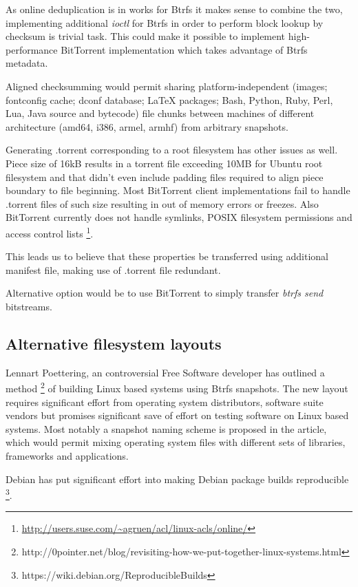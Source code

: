 \documentclass{article}
\begin{document}
As online deduplication is in works for Btrfs it makes sense to
combine the two, implementing additional \emph{ioctl} for Btrfs in
order to perform block lookup by checksum is trivial task.
This could make it possible to implement high-performance
BitTorrent implementation which takes advantage of Btrfs metadata.

Aligned checksumming would permit sharing platform-independent
(images; fontconfig cache; dconf database; LaTeX packages;
Bash, Python, Ruby, Perl, Lua, Java source and bytecode)
file chunks between machines of different architecture (amd64, i386, armel, armhf)
from arbitrary snapshots.

Generating .torrent corresponding to a root filesystem
has other issues as well.
Piece size of 16kB results in a torrent file
exceeding 10MB for Ubuntu root filesystem and that didn't even
include padding files required to align piece boundary to file beginning.
Most BitTorrent client implementations fail to handle .torrent
files of such size resulting in out of memory errors or freezes.
Also BitTorrent currently does not handle symlinks,
POSIX filesystem permissions and access control lists
\footnote{\url{http://users.suse.com/~agruen/acl/linux-acls/online/}}.

This leads us to believe that these properties be transferred
using additional manifest file, making use of .torrent file redundant.

Alternative option would be to use BitTorrent to simply
transfer \emph{btrfs send} bitstreams.


\subsection{Alternative filesystem layouts}

Lennart Poettering, an controversial Free Software developer has outlined a method
\footnote{http://0pointer.net/blog/revisiting-how-we-put-together-linux-systems.html}
of building Linux based systems using Btrfs snapshots.
The new layout requires significant effort from operating system distributors,
software suite vendors but promises significant save of effort on testing
software on Linux based systems.
Most notably a snapshot naming scheme is proposed in the article,
which would permit mixing operating system files with different
sets of libraries, frameworks and applications.




Debian has put significant effort into making Debian package builds reproducible
\footnote{https://wiki.debian.org/ReproducibleBuilds}.





\end{document}
